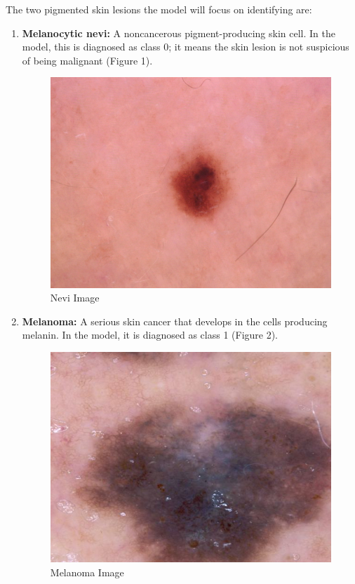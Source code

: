 \documentclass[10pt,twocolumn]{article}
\begin{document}
The two pigmented skin lesions the model will focus on identifying are:
\begin{enumerate}
    \item \textbf{Melanocytic nevi:} A noncancerous pigment-producing skin cell. In the model, this is diagnosed as class 0; it means the skin lesion is not suspicious of being malignant (Figure 1).
    \begin{figure}[h]
    \caption{Nevi Image}
    \includegraphics[scale=0.4]{ISIC_0024335.jpg}\newline
    \end{figure}
    \item \textbf{Melanoma:} A serious skin cancer that develops in the cells producing melanin. In the model, it is diagnosed as class 1 (Figure 2).
    \begin{figure}[h]
    \caption{Melanoma Image}
    \includegraphics[scale=0.4]{aug_mel__10_3539.jpg}\newline
    \end{figure}
 
\end{enumerate}
\end{document}
